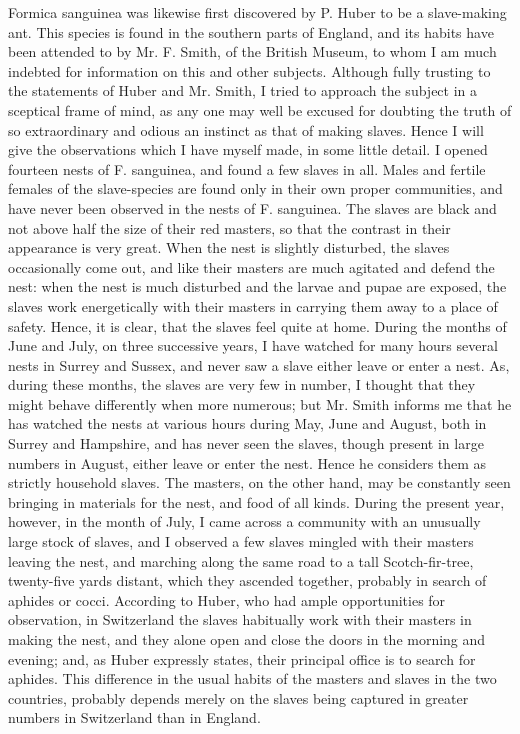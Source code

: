 Formica sanguinea was likewise first discovered by P. Huber to be a slave-making ant. This species is found in the southern parts of England, and its habits have been attended to by Mr. F. Smith, of the British Museum, to whom I am much indebted for information on this and other subjects. Although fully trusting to the statements of Huber and Mr. Smith, I tried to approach the subject in a sceptical frame of mind, as any one may well be excused for doubting the truth of so extraordinary and odious an instinct as that of making slaves. Hence I will give the observations which I have myself made, in some little detail. I opened fourteen nests of F. sanguinea, and found a few slaves in all. Males and fertile females of the slave-species are found only in their own proper communities, and have never been observed in the nests of F. sanguinea. The slaves are black and not above half the size of their red masters, so that the contrast in their appearance is very great. When the nest is slightly disturbed, the slaves occasionally come out, and like their masters are much agitated and defend the nest: when the nest is much disturbed and the larvae and pupae are exposed, the slaves work energetically with their masters in carrying them away to a place of safety. Hence, it is clear, that the slaves feel quite at home. During the months of June and July, on three successive years, I have watched for many hours several nests in Surrey and Sussex, and never saw a slave either leave or enter a nest. As, during these months, the slaves are very few in number, I thought that they might behave differently when more numerous; but Mr. Smith informs me that he has watched the nests at various hours during May, June and August, both in Surrey and Hampshire, and has never seen the slaves, though present in large numbers in August, either leave or enter the nest. Hence he considers them as strictly household slaves. The masters, on the other hand, may be constantly seen bringing in materials for the nest, and food of all kinds. During the present year, however, in the month of July, I came across a community with an unusually large stock of slaves, and I observed a few slaves mingled with their masters leaving the nest, and marching along the same road to a tall Scotch-fir-tree, twenty-five yards distant, which they ascended together, probably in search of aphides or cocci. According to Huber, who had ample opportunities for observation, in Switzerland the slaves habitually work with their masters in making the nest, and they alone open and close the doors in the morning and evening; and, as Huber expressly states, their principal office is to search for aphides. This difference in the usual habits of the masters and slaves in the two countries, probably depends merely on the slaves being captured in greater numbers in Switzerland than in England.
